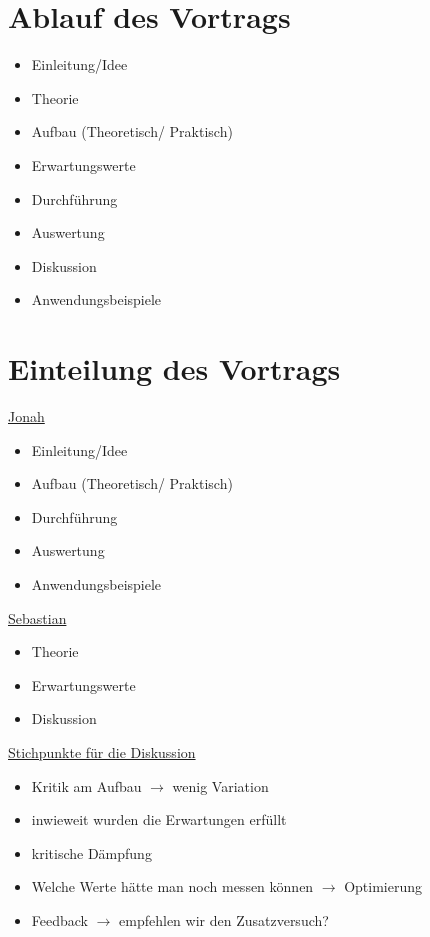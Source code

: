 



\section{Ablauf des Vortrags}

\begin{itemize}
  \item Einleitung/Idee
  \item Theorie
  \item Aufbau (Theoretisch/ Praktisch)
  \item Erwartungswerte
  \item Durchführung
  \item Auswertung
  \item Diskussion
  \item Anwendungsbeispiele
\end{itemize}

\section{Einteilung des Vortrags}

\underline{Jonah}

\begin{itemize}
  \item Einleitung/Idee
  \item Aufbau (Theoretisch/ Praktisch)
  \item Durchführung
  \item Auswertung
  \item Anwendungsbeispiele
\end{itemize}

\underline{Sebastian}

\begin{itemize}
  \item Theorie
  \item Erwartungswerte
  \item Diskussion
\end{itemize}

\underline{Stichpunkte für die Diskussion}

\begin{itemize}
  \item Kritik am Aufbau $\rightarrow$ wenig Variation
  \item inwieweit wurden die Erwartungen erfüllt
  \item kritische Dämpfung
  \item Welche Werte hätte man noch messen können $\rightarrow$ Optimierung
  \item Feedback $\rightarrow$ empfehlen wir den Zusatzversuch?
\end{itemize}



